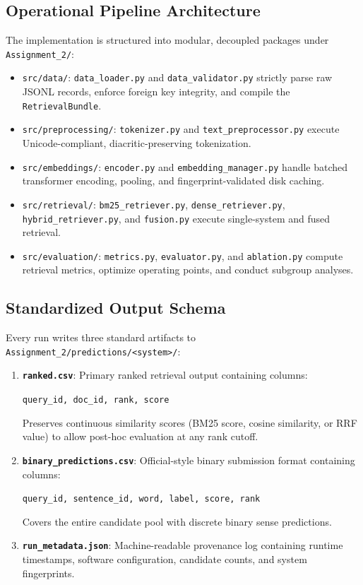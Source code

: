 \subsection{Operational Pipeline Architecture}
The implementation is structured into modular, decoupled packages under \texttt{Assignment\_2/}:
\begin{itemize}
    \item \texttt{src/data/}: \texttt{data\_loader.py} and \texttt{data\_validator.py} strictly parse raw JSONL records, enforce foreign key integrity, and compile the \texttt{RetrievalBundle}.
    \item \texttt{src/preprocessing/}: \texttt{tokenizer.py} and \texttt{text\_preprocessor.py} execute Unicode-compliant, diacritic-preserving tokenization.
    \item \texttt{src/embeddings/}: \texttt{encoder.py} and \texttt{embedding\_manager.py} handle batched transformer encoding, pooling, and fingerprint-validated disk caching.
    \item \texttt{src/retrieval/}: \texttt{bm25\_retriever.py}, \texttt{dense\_retriever.py}, \texttt{hybrid\_retriever.py}, and \texttt{fusion.py} execute single-system and fused retrieval.
    \item \texttt{src/evaluation/}: \texttt{metrics.py}, \texttt{evaluator.py}, and \texttt{ablation.py} compute retrieval metrics, optimize operating points, and conduct subgroup analyses.
\end{itemize}

\subsection{Standardized Output Schema}
Every run writes three standard artifacts to \texttt{Assignment\_2/predictions/<system>/}:
\begin{enumerate}
    \item \textbf{\texttt{ranked.csv}}: Primary ranked retrieval output containing columns:
    \begin{center}
    \texttt{query\_id, doc\_id, rank, score}
    \end{center}
    Preserves continuous similarity scores (BM25 score, cosine similarity, or RRF value) to allow post-hoc evaluation at any rank cutoff.
    \item \textbf{\texttt{binary\_predictions.csv}}: Official-style binary submission format containing columns:
    \begin{center}
    \texttt{query\_id, sentence\_id, word, label, score, rank}
    \end{center}
    Covers the entire candidate pool with discrete binary sense predictions.
    \item \textbf{\texttt{run\_metadata.json}}: Machine-readable provenance log containing runtime timestamps, software configuration, candidate counts, and system fingerprints.
\end{enumerate}

